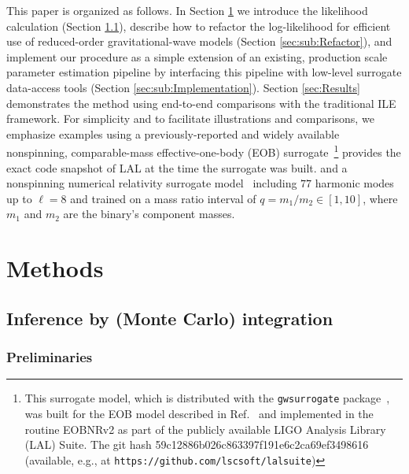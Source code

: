 \documentclass[aps,prd,nofootinbib,showpacs,amssymb,twocolumn]{revtex4}
\newcommand\ILE{ILE}
\begin{document}
This paper is organized as follows.  In Section \ref{sec:Methods} we 
%
introduce
the likelihood
calculation (Section \ref{sec:sub:PEBackground}), 
describe how to refactor the log-likelihood
%
for efficient use of reduced-order 
gravitational-wave models (Section \ref{sec:sub:Refactor}), 
%
and 
implement
%
our procedure as a simple
extension of an existing, production scale parameter estimation pipeline
by interfacing this pipeline with low-level
surrogate data-access tools (Section \ref{sec:sub:Implementation}).
%
%
%
%
%
%
Section \ref{sec:Results}
%
demonstrates the method using end-to-end comparisons with the traditional \ILE{} framework. For simplicity and to facilitate illustrations and
comparisons, we emphasize 
%
examples
using a previously-reported and widely available nonspinning, comparable-mass
effective-one-body (EOB) surrogate~\cite{2014PhRvX...4c1006F}\footnote{\label{foot:GWS}This surrogate model, which is distributed with the \texttt{gwsurrogate} package~\cite{gwsurrogate}, was built for the EOB model described in Ref.~\cite{pan2011inspiral} and implemented in the routine EOBNRv2 as part of the publicly available LIGO Analysis Library (LAL) Suite. The git hash 
59c12886b026c863397f191e6c2ca69ef3498616 (available, e.g., at \texttt{https://github.com/lscsoft/lalsuite})} provides the exact code snapshot of LAL at the time the surrogate was built.
and a nonspinning numerical relativity surrogate model~\cite{gwastro-approx-ROMNR-Blackman2015} 
%
including
$77$ harmonic modes up to $\ell=8$ and trained on a mass ratio interval of $q = m_1 / m_2 \in [1,10]$, where $m_1$ and $m_2$ are the binary's component masses.
%
%
%
%

\section{Methods}
\label{sec:Methods}

%
\subsection{Inference by (Monte Carlo) integration}
\label{sec:sub:PEBackground}

\subsubsection{Preliminaries}
\end{document}
